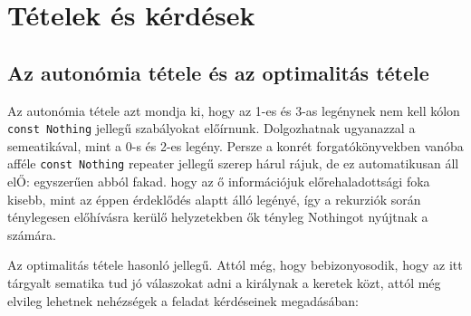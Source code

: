 \documentclass{article}
\newcommand{\blk}{\cellcolor{darkgray}}
\newcommand{\red}{\cellcolor{red!33}}
\newcommand{\grn}{\cellcolor{green!33}}
\newcommand{\just}[1]{\boxed{#1}}%
\newcommand{\incl}{\mathbf{incl}}
\newcommand{\excl}{\mathbf{excl}}
\begin{document}
\begin{comment}
		$2\frac12$	&	\blk		&	\blk		&	\red\just\excl	&	\grn\just\incl	&	\blk		&	\blk		\\\hline
		$2\frac34$	&	\blk		&	\blk		&	\red\just\excl	&	\grn\just\incl	&	\blk		&	\blk		\\\hline
			$3$	&	\blk		&	\blk		&	\blk		&	\blk		&	\blk		&	\blk		\\\hline
		$3\frac14$	&	\blk		&	\blk		&	\blk		&	\blk		&	\blk		&	\blk		\\\hline
		$3\frac12$	&	\blk		&	\blk		&	\blk		&	\blk		&	\blk		&	\blk		\\\hline
		$3\frac34$	&	\blk		&	\blk		&	\blk		&	\blk		&	\blk		&	\blk		\\\hline
		\end{tabular}
	\end{table}





	A ,,negyedes'' legények (1, 3) kitöltésekor érzékeljük, hogy információveszteség történik: nem figyeljük, egy-egy legény mennyi bárányt számol az egyik irányban külön és a másik irányban külön.
	Ez a fajta információvesztés --- ,,a karok vesztesége'' --- a később említendő ,,optimalitás tétele'' szempontjából lesz érdekes.

	\end{comment}

	\section{Tételek és kérdések}

	\subsection{Az autonómia tétele és az optimalitás tétele}

	Az autonómia tétele azt mondja ki, hogy az 1-es és 3-as legénynek nem kell kólon \texttt{const Nothing} jellegű szabályokat előírnunk.
	Dolgozhatnak ugyanazzal a semeatikával, mint a 0-s és 2-es legény. Persze a konrét forgatókönyvekben vanóba afféle \texttt{const Nothing} repeater jellegű szerep hárul rájuk,
	de ez automatikusan áll elŐ: egyszerűen abból fakad. hogy az ő információjuk előrehaladottsági foka kisebb, mint az éppen érdeklődés alaptt álló legényé, így a rekurziók során ténylegesen előhívásra kerülő helyzetekben ők tényleg Nothingot nyújtnak a számára.

	Az optimalitás tétele hasonló jellegű. Attól még, hogy bebizonyosodik, hogy az itt tárgyalt sematika tud jó válaszokat adni a királynak a keretek közt, attól még elvileg lehetnek nehézségek a feladat kérdéseinek megadásában:
\end{document}
